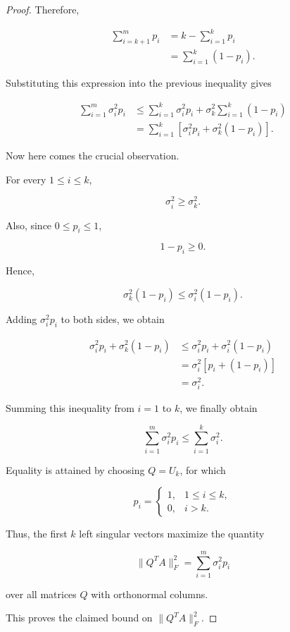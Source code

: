 \documentclass[11pt]{article}
\begin{document}
\begin{proof}
Therefore,

\[
\begin{aligned}
\sum_{i=k+1}^{m}p_i
&=k-\sum_{i=1}^{k}p_i\\
&=\sum_{i=1}^{k}(1-p_i).
\end{aligned}
\]

Substituting this expression
into the previous inequality gives

\[
\begin{aligned}
\sum_{i=1}^{m}\sigma_i^2p_i
&\leq
\sum_{i=1}^{k}\sigma_i^2p_i
+
\sigma_k^2\sum_{i=1}^{k}(1-p_i)\\
&=
\sum_{i=1}^{k}
\left[
\sigma_i^2p_i+
\sigma_k^2(1-p_i)
\right].
\end{aligned}
\]

Now here comes the crucial observation.

For every $1\leq i\leq k$,

\[
\sigma_i^2\geq\sigma_k^2.
\]

Also, since $0\leq p_i\leq 1$,

\[
1-p_i\geq 0.
\]

Hence,

\[
\sigma_k^2(1-p_i)
\leq
\sigma_i^2(1-p_i).
\]

Adding $\sigma_i^2p_i$
to both sides, we obtain

\[
\begin{aligned}
\sigma_i^2p_i+\sigma_k^2(1-p_i)
&\leq
\sigma_i^2p_i+\sigma_i^2(1-p_i)\\
&=
\sigma_i^2[p_i+(1-p_i)]\\
&=\sigma_i^2.
\end{aligned}
\]

Summing this inequality
from $i=1$ to $k$,
we finally obtain

\[
\boxed{
\sum_{i=1}^{m}\sigma_i^2p_i
\leq
\sum_{i=1}^{k}\sigma_i^2.
}
\]

Equality is attained by choosing
$Q=U_k$, for which

\[
p_i=
\begin{cases}
1, & 1\leq i\leq k,\\
0, & i>k.
\end{cases}
\]

Thus, the first $k$ left singular
vectors maximize the quantity

\[
\|Q^TA\|_F^2
=
\sum_{i=1}^{m}\sigma_i^2p_i
\]

over all matrices $Q$ with
orthonormal columns.

This proves the claimed bound on
$\|Q^TA\|_F^2$.


\end{proof}
\end{document}
